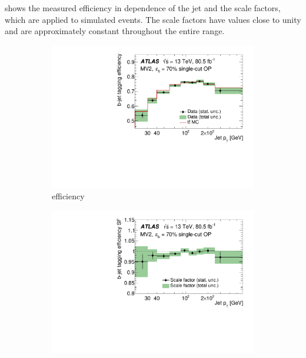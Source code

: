 shows the measured \btagging efficiency in dependence of the jet \pt and the scale factors, which are applied to simulated events. The scale factors have values close to unity and are approximately constant throughout the entire \pt range.

\begin{figure}[htbp]
    \centering
    \begin{subfigure}{.49\textwidth}
      \centering
      \includegraphics[width=1.\textwidth]{figures/methods/btagging_efficiency70.pdf}
      \caption{\btagging efficiency}
      \label{fig:methods:event-reconstruction:jets:btagging:corrections:efficiency}
    \end{subfigure}
    \begin{subfigure}{.49\textwidth}
      \centering
      \includegraphics[width=1.\textwidth]{figures/methods/btagging_sf70.pdf}

\end{subfigure}
\end{figure}
